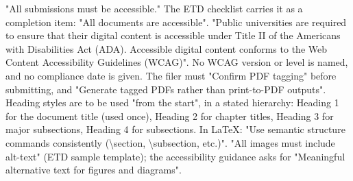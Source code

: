 %
%
%
%
\thesisrequiretagging
{}
	{"All submissions must be accessible." The ETD checklist carries it as a
	 completion item: "All documents are accessible".}
	{"Public universities are required to ensure that their digital content is
	 accessible under Title II of the Americans with Disabilities Act (ADA).
	 Accessible digital content conforms to the Web Content Accessibility
	 Guidelines (WCAG)". No WCAG version or level is named, and no compliance
	 date is given.}
	{The filer must "Confirm PDF tagging" before submitting, and "Generate
	 tagged PDFs rather than print-to-PDF outputs".}
	{Heading styles are to be used "from the start", in a stated hierarchy:
	 Heading 1 for the document title (used once), Heading 2 for chapter titles,
	 Heading 3 for major subsections, Heading 4 for subsections. In LaTeX: "Use
	 semantic structure commands consistently (\textbackslash section,
	 \textbackslash subsection, etc.)".}
	{"All images must include alt-text" (ETD sample template); the accessibility
	 guidance asks for "Meaningful alternative text for figures and diagrams".}
